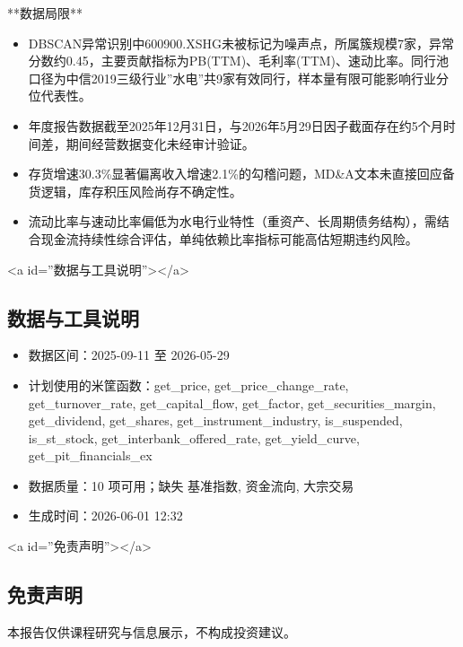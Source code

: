 \documentclass[12pt,a4paper]{article}
\begin{document}
**数据局限**

\begin{itemize}
\item DBSCAN异常识别中600900.XSHG未被标记为噪声点，所属簇规模7家，异常分数约0.45，主要贡献指标为PB(TTM)、毛利率(TTM)、速动比率。同行池口径为中信2019三级行业''水电''共9家有效同行，样本量有限可能影响行业分位代表性。
\item 年度报告数据截至2025年12月31日，与2026年5月29日因子截面存在约5个月时间差，期间经营数据变化未经审计验证。
\item 存货增速30.3\%显著偏离收入增速2.1\%的勾稽问题，MD\&A文本未直接回应备货逻辑，库存积压风险尚存不确定性。
\item 流动比率与速动比率偏低为水电行业特性（重资产、长周期债务结构），需结合现金流持续性综合评估，单纯依赖比率指标可能高估短期违约风险。
\end{itemize}

<a id=''数据与工具说明''></a>

\subsection{ 数据与工具说明}
\begin{itemize}
\item 数据区间：2025-09-11 至 2026-05-29
\item 计划使用的米筐函数：get\_price, get\_price\_change\_rate, get\_turnover\_rate, get\_capital\_flow, get\_factor, get\_securities\_margin, get\_dividend, get\_shares, get\_instrument\_industry, is\_suspended, is\_st\_stock, get\_interbank\_offered\_rate, get\_yield\_curve, get\_pit\_financials\_ex
\item 数据质量：10 项可用；缺失 基准指数, 资金流向, 大宗交易
\item 生成时间：2026-06-01 12:32
\end{itemize}

<a id=''免责声明''></a>

\subsection{ 免责声明}
本报告仅供课程研究与信息展示，不构成投资建议。
\end{document}
